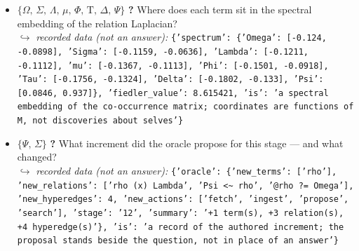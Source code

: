 \documentclass[11pt]{article}
\newcommand{\Tau}{\mathrm{T}}
\begin{document}
\begin{itemize}
\item $\{\Omega,\,\Sigma,\,\Lambda,\,\mu,\,\Phi,\,\Tau,\,\Delta,\,\Psi\}$ \quad \textbf{?} Where does each term sit in the spectral embedding of the relation Laplacian? \\ \hspace*{1em}$\hookrightarrow$ \emph{recorded data (not an answer):} \texttt{\{'spectrum': \{'Omega': [-0.124, -0.0898], 'Sigma': [-0.1159, -0.0636], 'Lambda': [-0.1211, -0.1112], 'mu': [-0.1367, -0.1113], 'Phi': [-0.1501, -0.0918], 'Tau': [-0.1756, -0.1324], 'Delta': [-0.1802, -0.133], 'Psi': [0.0846, 0.937]\}, 'fiedler\_value': 8.615421, 'is': 'a spectral embedding of the co-occurrence matrix; coordinates are functions of M, not discoveries about selves'\}}
\item $\{\Psi,\,\Sigma\}$ \quad \textbf{?} What increment did the oracle propose for this stage — and what changed? \\ \hspace*{1em}$\hookrightarrow$ \emph{recorded data (not an answer):} \texttt{\{'oracle': \{'new\_terms': ['rho'], 'new\_relations': ['rho (x) Lambda', 'Psi <\textasciitilde{} rho', '@rho ?= Omega'], 'new\_hyperedges': 4, 'new\_actions': ['fetch', 'ingest', 'propose', 'search'], 'stage': '12', 'summary': '+1 term(s), +3 relation(s), +4 hyperedge(s)'\}, 'is': 'a record of the authored increment; the proposal stands beside the question, not in place of an answer'\}}

\end{itemize}
\end{document}
